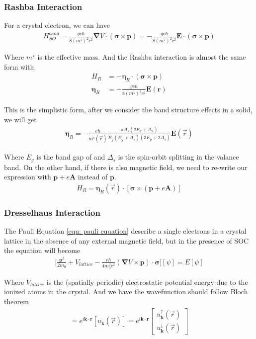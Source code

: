 \subsubsection{Rashba Interaction}
\label{sec: rashba interaction}
For a crystal electron, we can have 
\begin{align*}
	H^{band}_{SO}=\frac{ge\hbar}{8(m^\star)^2 c^2}\pmb{\nabla}V\cdot(\pmb{\sigma}\times\pmb{p})=-\frac{ge\hbar}{8(m^\star)^2 c^2}\pmb{E}\cdot(\pmb{\sigma}\times\pmb{p})
\end{align*}

Where $m^\star$ is the effective mass. And the Rashba interaction is almost the same form with
\begin{align}
	H_R&=-\pmb{\eta}_R\cdot(\pmb{\sigma}\times\pmb{p})\\
	\pmb{\eta}_R&=-\frac{ge\hbar}{8(m^\star)^2 c^2}\pmb{E}(\pmb{r})
\end{align}

This is the simplistic form, after we consider the band structure effects in a solid, we will get 
\begin{align}
	\pmb{\eta}_R=-\frac{e\hbar}{m^\star(\vec{r})} \frac{\pi \Delta_s(2E_g+\Delta_s)}{E_g(E_g+\Delta_s)(3E_g+2\Delta_s)}\pmb{E}(\vec{r})	
	\label{equ: rashba effect coefeicient}
\end{align}

Where $E_g$ is the band gap of and $\Delta_s$ is the spin-orbit splitting in the valance band.  On the other hand, if there is also magnetic field, we need to re-write our expression with $\pmb{p}+e\pmb{A}$ instead of $\pmb{p}$.
\begin{align*}
	H_R=\pmb{\eta}_R(\vec{r})\cdot [\pmb{\sigma}\times(\pmb{p}+e\pmb{A})]
\end{align*}


\subsubsection{Dresselhaus Interaction}
\label{sec: dresselhaus interaction}
The Pauli Equation \ref{equ: pauli equation} describe a single electrons in a crystal lattice in the absence of any external magnetic field, but in the presence of SOC the equation will become
\begin{align}
	\Big[\frac{\pmb{p}^2}{2m_0}+V_{lattice}-\frac{e\hbar}{4m_0^2c^2}(\pmb{\nabla}V\times\pmb{p})\cdot\pmb{\sigma} \Big][\psi]=E[\psi]
	\label{equ: pauli equation with SOC}	
\end{align}

Where $V_{lattice}$ is the (spatially periodic) electrostatic potential energy due to the ionized atoms in the crystal. And we have the wavefunction should follow Bloch theorem
\begin{align*}
	[\psi]=e^{i \pmb{k}\cdot \pmb{r}}[u_{\pmb{k}}(\vec{r})]=e^{i \pmb{k}\cdot \pmb{r}}\begin{bmatrix}
		u^\uparrow _{\pmb{k}}(\vec{r})\\u^\downarrow _{\pmb{k}}(\vec{r})
	\end{bmatrix}
\end{align*}

